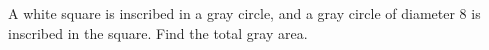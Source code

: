 A white square is inscribed in a gray circle, and a gray circle of diameter 8 is inscribed in the square. Find the total gray area.
